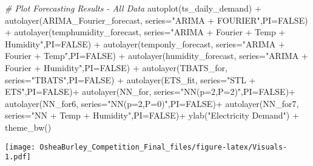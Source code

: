 \documentclass[
]{article}
\newenvironment{Shaded}{\begin{snugshade}}{\end{snugshade}}
\newcommand{\AttributeTok}[1]{\textcolor[rgb]{0.77,0.63,0.00}{#1}}
\newcommand{\CommentTok}[1]{\textcolor[rgb]{0.56,0.35,0.01}{\textit{#1}}}
\newcommand{\ConstantTok}[1]{\textcolor[rgb]{0.00,0.00,0.00}{#1}}
\newcommand{\FunctionTok}[1]{\textcolor[rgb]{0.00,0.00,0.00}{#1}}
\newcommand{\NormalTok}[1]{#1}
\newcommand{\SpecialCharTok}[1]{\textcolor[rgb]{0.00,0.00,0.00}{#1}}
\newcommand{\StringTok}[1]{\textcolor[rgb]{0.31,0.60,0.02}{#1}}
\begin{document}
\begin{Shaded}
\begin{Highlighting}[]
\CommentTok{\# Plot Forecasting Results {-} All Data}
\FunctionTok{autoplot}\NormalTok{(ts\_daily\_demand) }\SpecialCharTok{+}
  \FunctionTok{autolayer}\NormalTok{(ARIMA\_Fourier\_forecast, }\AttributeTok{series=}\StringTok{"ARIMA + FOURIER"}\NormalTok{,}\AttributeTok{PI=}\ConstantTok{FALSE}\NormalTok{) }\SpecialCharTok{+}
  \FunctionTok{autolayer}\NormalTok{(temphumidity\_forecast, }\AttributeTok{series=}\StringTok{"ARIMA + Fourier + Temp + Humidity"}\NormalTok{,}\AttributeTok{PI=}\ConstantTok{FALSE}\NormalTok{) }\SpecialCharTok{+}
  \FunctionTok{autolayer}\NormalTok{(temponly\_forecast, }\AttributeTok{series=}\StringTok{"ARIMA + Fourier + Temp"}\NormalTok{,}\AttributeTok{PI=}\ConstantTok{FALSE}\NormalTok{) }\SpecialCharTok{+}
  \FunctionTok{autolayer}\NormalTok{(humidity\_forecast, }\AttributeTok{series=}\StringTok{"ARIMA + Fourier + Humidity"}\NormalTok{,}\AttributeTok{PI=}\ConstantTok{FALSE}\NormalTok{) }\SpecialCharTok{+}
  \FunctionTok{autolayer}\NormalTok{(TBATS\_for, }\AttributeTok{series=}\StringTok{"TBATS"}\NormalTok{,}\AttributeTok{PI=}\ConstantTok{FALSE}\NormalTok{) }\SpecialCharTok{+}
  \FunctionTok{autolayer}\NormalTok{(ETS\_fit, }\AttributeTok{series=}\StringTok{"STL + ETS"}\NormalTok{,}\AttributeTok{PI=}\ConstantTok{FALSE}\NormalTok{)}\SpecialCharTok{+}
  \FunctionTok{autolayer}\NormalTok{(NN\_for, }\AttributeTok{series=}\StringTok{"NN(p=2,P=2)"}\NormalTok{,}\AttributeTok{PI=}\ConstantTok{FALSE}\NormalTok{)}\SpecialCharTok{+}
  \FunctionTok{autolayer}\NormalTok{(NN\_for6, }\AttributeTok{series=}\StringTok{"NN(p=2,P=0)"}\NormalTok{,}\AttributeTok{PI=}\ConstantTok{FALSE}\NormalTok{)}\SpecialCharTok{+}
  \FunctionTok{autolayer}\NormalTok{(NN\_for7, }\AttributeTok{series=}\StringTok{"NN + Temp + Humidity"}\NormalTok{,}\AttributeTok{PI=}\ConstantTok{FALSE}\NormalTok{)}\SpecialCharTok{+}
  \FunctionTok{ylab}\NormalTok{(}\StringTok{"Electricity Demand"}\NormalTok{) }\SpecialCharTok{+}
  \FunctionTok{theme\_bw}\NormalTok{()}
\end{Highlighting}
\end{Shaded}

\texttt{[image: OsheaBurley\_Competition\_Final\_files/figure-latex/Visuals-1.pdf]}
\end{document}
